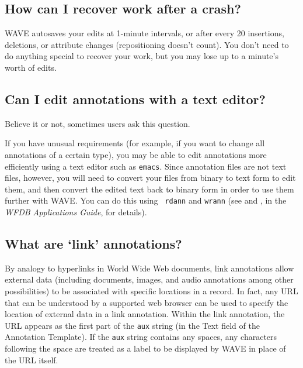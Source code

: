 \documentclass[twoside]{book}
\newcommand{\WAVE}{{\sf WAVE}\xspace}
\begin{document}
\subsection{How can I recover work after a crash?}

\WAVE{} autosaves your edits at 1-minute intervals, or after every 20
insertions, deletions, or attribute changes (repositioning doesn't
count).  You don't need to do anything special to recover your work,
but you may lose up to a minute's worth of edits.

\subsection{Can I edit annotations with a text editor?}

Believe it or not, sometimes users ask this question.

If you have unusual requirements (for example, if you want to change all
annotations of a certain type), you may be able to edit annotations more
efficiently using a text editor such as {\tt emacs}.  Since annotation files
are not text files, however, you will need to convert your files from binary
to text form to edit them, and then convert the edited text back to binary
form in order to use them further with \WAVE{}.  You can do this using {\tt
rdann} and {\tt wrann} (see
 and
,
in the {\it WFDB Applications Guide}, for details).

\subsection{What are `link' annotations?}

By analogy to hyperlinks in World Wide Web documents, link annotations
allow external data (including documents, images, and audio
annotations among other possibilities) to be associated with specific
locations in a record.  In fact, any URL that can be understood by a
supported web browser can be used to specify the location of external
data in a link annotation.  Within the link annotation, the URL
appears as the first part of the {\tt aux} string (in the {\sf Text}
field of the {\sf Annotation Template}).  If the {\tt aux} string
contains any spaces, any characters following the space are treated as
a label to be displayed by \WAVE{} in place of the URL itself.
\end{document}
